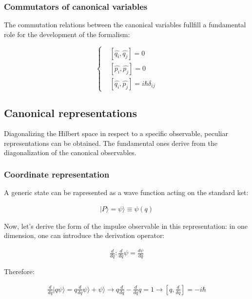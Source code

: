\documentclass{article}
\begin{document}
\subsubsection{Commutators of canonical variables}

The commutation relations between the canonical variables fullfill a fundamental role for the development of the formalism:

\begin{equation}
  \left\{
  \begin{aligned}
     & [\hat{q_i}, \hat{q_j}]=0                  \\
     & [\hat{p_i}, \hat{p_j}]=0                  \\
     & [\hat{q_i}, \hat{p_j}]=i\hbar \delta_{ij}
  \end{aligned}
  \right.
\end{equation}

\subsection{Canonical representations}
Diagonalizing the Hilbert space in respect to a specific observable, peculiar representations can be obtained.
The fundamental ones derive from the diagonalization of the canonical observables.

\subsubsection{Coordinate representation}

A generic state can be rapresented as a wave function acting on the standard ket:

\begin{align*}
  |P\rangle = \psi\rangle \equiv \psi(q)
\end{align*}

Now, let's derive the form of the impulse observable in this representation:
in one dimension, one can introduce the derivation operator:

\begin{align*}
  \frac{d}{dq} : \frac{d}{dq} \psi = \frac{d \psi}{dq}
\end{align*}

Therefore:


\begin{align*}
  \frac{d}{dq} |q\psi\rangle = q\frac{d}{dq}\psi\rangle  + \psi\rangle  \longrightarrow q\frac{d}{dq}-\frac{d}{dq}q=1 \longrightarrow [q,\frac{d}{dq}]=-i\hbar
\end{align*}
\end{document}
